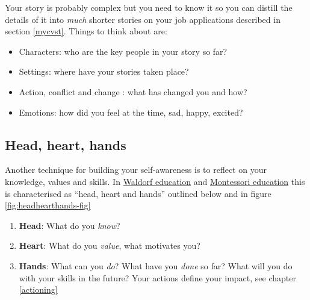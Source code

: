 \documentclass[
]{book}
\providecommand{\tightlist}{%
  \setlength{\itemsep}{0pt}\setlength{\parskip}{0pt}}
\begin{document}
Your story is probably complex but you need to know it so you can distill the details of it into \emph{much} shorter stories on your job applications described in section \ref{mycvst}. Things to think about are:

\begin{itemize}
\tightlist
\item
  Characters: who are the key people in your story so far?
\item
  Settings: where have your stories taken place?
\item
  Action, conflict and change : what has changed you and how?
\item
  Emotions: how did you feel at the time, sad, happy, excited?
\end{itemize}

\hypertarget{hhh}{%
\subsection{Head, heart, hands}\label{hhh}}

Another technique for building your self-awareness is to reflect on your knowledge, values and skills. In \href{https://en.wikipedia.org/wiki/Waldorf_education}{Waldorf education} and \href{https://en.wikipedia.org/wiki/Montessori_education}{Montessori education} this is characterised as ``head, heart and hands'' outlined below and in figure \ref{fig:headhearthands-fig} \citep{headhearthands}

\begin{enumerate}
\def\labelenumi{\arabic{enumi}.}
\tightlist
\item
  \textbf{Head}: What do you \emph{know}?
\item
  \textbf{Heart}: What do you \emph{value}, what motivates you?
\item
  \textbf{Hands}: What can you \emph{do}? What have you \emph{done} so far? What will you do with your skills in the future? Your actions define your impact, see chapter \ref{actioning}
\end{enumerate}
\end{document}

